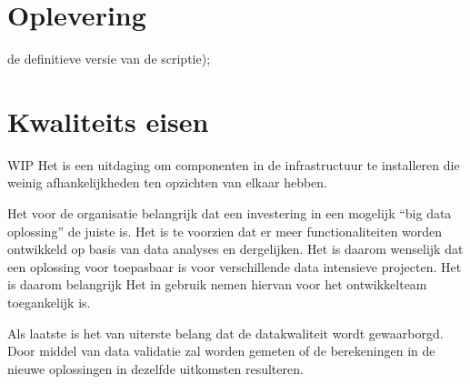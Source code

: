 \section{Oplevering}

de definitieve versie van de scriptie);

\section{Kwaliteits eisen}

WIP
Het is een uitdaging om componenten in de infrastructuur te installeren die weinig afhankelijkheden ten opzichten van elkaar hebben.

Het voor de organisatie belangrijk dat een investering in een mogelijk “big data oplossing” de juiste is. Het is te voorzien dat er meer functionaliteiten worden ontwikkeld op basis van data analyses en dergelijken. Het is daarom wenselijk dat een oplossing voor toepasbaar is voor verschillende data intensieve projecten. Het is daarom belangrijk Het in gebruik nemen hiervan voor het ontwikkelteam toegankelijk is.

Als laatste is het van uiterste belang dat de datakwaliteit wordt gewaarborgd. Door middel van data validatie zal worden gemeten of de berekeningen in de nieuwe oplossingen in dezelfde uitkomsten resulteren.
